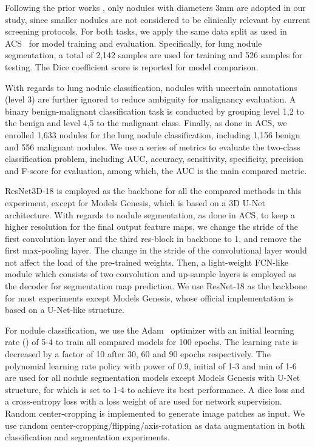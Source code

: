 \documentclass[journal,twoside,web]{ieeecolor}
\begin{document}
Following the prior works \cite{xie2018knowledge,yang2019reinventing}, only nodules with diameters  3mm are adopted in our study, since smaller nodules are not considered to be clinically relevant by current screening protocols. For both tasks, we apply the same data split as used in ACS~\cite{yang2019reinventing} for model training and evaluation. Specifically, for lung nodule segmentation, a total of 2,142 samples are used for training and 526 samples for testing. The Dice coefficient score is reported for model comparison. 

With regards to lung nodule classification, nodules with uncertain annotations (level 3) are further ignored to reduce ambiguity for malignancy evaluation. A binary benign-malignant classification task is conducted by grouping level 1,2 to the benign and level 4,5 to the malignant class. Finally, as done in ACS, we enrolled 1,633 nodules for the lung nodule classification, including 1,156 benign and 556 malignant nodules. We use a series of metrics to evaluate the two-class classification problem, including AUC, accuracy, sensitivity, specificity, precision and F-score for evaluation, among which, the AUC is the main compared metric. 

ResNet3D-18 is employed as the backbone for all the compared methods in this experiment, except for Models Genesis, which is based on a 3D U-Net architecture. With regards to nodule segmentation, as done in ACS, to keep a higher resolution for the final output feature maps, we change the stride of the first convolution layer and the third res-block in backbone to 1, and remove the first max-pooling layer. The change in the stride of the convolutional layer would not affect the load of the pre-trained weights. Then, a light-weight FCN-like~\cite{long2015fully} module which consists of two convolution and up-sample layers is employed as the decoder for segmentation map prediction.  
We use ResNet-18 as the backbone for most experiments except Models Genesis, whose official implementation is based on a U-Net-like structure. 

For nodule classification, we use the Adam~\cite{kingma2014adam} optimizer with an initial learning rate () of 5-4 to train all compared models for 100 epochs. The learning rate is decreased by a factor of 10 after 30, 60 and 90 epochs respectively.
The polynomial learning rate policy with power of 0.9, initial  of 1-3 and min  of 1-6 are used for all nodule segmentation models except Models Genesis with U-Net structure, for which  is set to 1-4 to achieve its best performance. A dice loss and a cross-entropy loss with a loss weight of  are used for network supervision. Random center-cropping is implemented to generate  image patches as input. We use random center-cropping/flipping/axis-rotation as data augmentation in both classification and segmentation experiments. 
\end{document}
